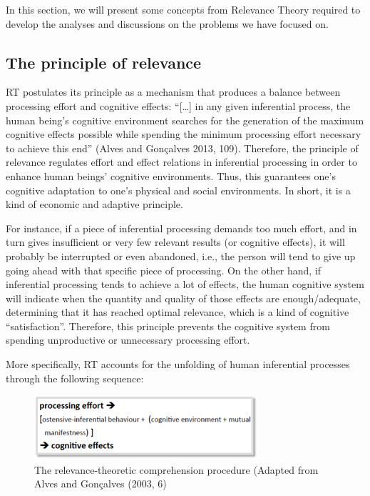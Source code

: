 \documentclass[output=paper]{langsci/langscibook}
\begin{document}
In this section, we will present some concepts from Relevance Theory required to develop the analyses and discussions on the problems we have focused on.


\subsection{The principle of relevance}

RT postulates its principle as a mechanism that produces a balance between processing effort and cognitive effects: “[…] in any given inferential process, the human being’s cognitive environment searches for the generation of the maximum cognitive effects possible while spending the minimum processing effort necessary to achieve this end” (Alves and Gonçalves 2013, 109). Therefore, the principle of relevance regulates effort and effect relations in inferential processing in order to enhance human beings’ cognitive environments. Thus, this guarantees one’s cognitive adaptation to one’s physical and social environments. In short, it is a kind of economic and adaptive principle.


For instance, if a piece of inferential processing demands too much effort, and in turn gives insufficient or very few relevant results (or cognitive effects), it will probably be interrupted or even abandoned, i.e., the person will tend to give up going ahead with that specific piece of processing. On the other hand, if inferential processing tends to achieve a lot of effects, the human cognitive system will indicate when the quantity and quality of those effects are enough/adequate, determining that it has reached optimal relevance, which is a kind of cognitive “satisfaction”. Therefore, this principle prevents the cognitive system from spending unproductive or unnecessary processing effort.



More specifically, RT accounts for the unfolding of human inferential processes through the following sequence:


  
\begin{figure}
 \includegraphics[width=\textwidth]{figures/Sarto1.png}
 \caption{The relevance-theoretic comprehension procedure (Adapted from Alves and Gonçalves (2003, 6)}
 \label{fig:1}
\end{figure} 
\end{document}
